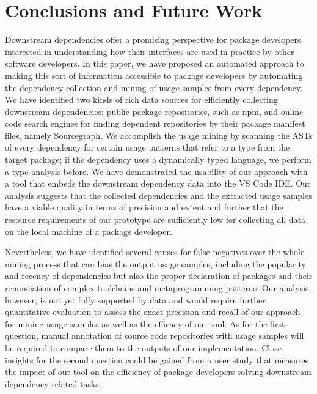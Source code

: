 \documentclass[a4paper,twoside]{article}
\begin{document}
\section{Conclusions and Future Work}
\label{sec:conclusion}

Downstream dependencies offer a promising perspective for package developers interested in understanding how their interfaces are used in practice by other software developers.
In this paper, we have proposed an automated approach to making this sort of information accessible to package developers by automating the dependency collection and mining of usage samples from every dependency.
We have identified two kinds of rich data sources for efficiently collecting downstream dependencies: public package repositories, such as npm, and online code search engines for finding dependent repositories by their package manifest files, namely Sourcegraph.
We accomplish the usage mining by scanning the ASTs of every dependency for certain usage patterns that refer to a type from the target package; if the dependency uses a dynamically typed language, we perform a type analysis before.
We have demonstrated the usability of our approach with a tool that embeds the downstream dependency data into the VS Code IDE.
%
Our analysis suggests that the collected dependencies and the extracted usage samples have a viable quality in terms of precision and extent and further that the resource requirements of our prototype are sufficiently low for collecting all data on the local machine of a package developer.

Nevertheless, we have identified several causes for false negatives over the whole mining process that can bias the output usage samples, including the popularity and recency of dependencies but also the proper declaration of packages and their renunciation of complex toolchains and metaprogramming patterns.
Our analysis, however, is not yet fully supported by data and would require further quantitative evaluation to assess the exact precision and recall of our approach for mining usage samples as well as the efficacy of our tool.
As for the first question, manual annotation of source code repositories with usage samples will be required to compare them to the outputs of our implementation.
Close insights for the second question could be gained from a user study that measures the impact of our tool on the efficiency of package developers solving downstream dependency-related tasks.
\end{document}
